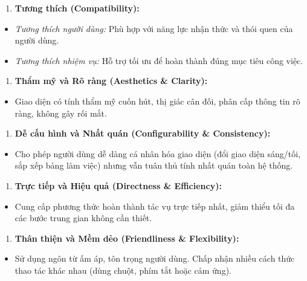 \documentclass[11pt,a4paper,oneside]{report}
\begin{document}
\begin{enumerate}[leftmargin=1.5em]
\item \textbf{Tương thích (Compatibility):}
\end{enumerate}
\begin{itemize}[leftmargin=1.5em]
\item \textit{Tương thích người dùng:} Phù hợp với năng lực nhận thức và thói quen của người dùng.
\item \textit{Tương thích nhiệm vụ:} Hỗ trợ tối ưu để hoàn thành đúng mục tiêu công việc.
\end{itemize}
\begin{enumerate}[leftmargin=1.5em]
\item \textbf{Thẩm mỹ và Rõ ràng (Aesthetics \& Clarity):}
\end{enumerate}
\begin{itemize}[leftmargin=1.5em]
\item Giao diện có tính thẩm mỹ cuốn hút, thị giác cân đối, phân cấp thông tin rõ ràng, không gây rối mắt.
\end{itemize}
\begin{enumerate}[leftmargin=1.5em]
\item \textbf{Dễ cấu hình và Nhất quán (Configurability \& Consistency):}
\end{enumerate}
\begin{itemize}[leftmargin=1.5em]
\item Cho phép người dùng dễ dàng cá nhân hóa giao diện (đổi giao diện sáng/tối, sắp xếp bảng làm việc) nhưng vẫn tuân thủ tính nhất quán toàn hệ thống.
\end{itemize}
\begin{enumerate}[leftmargin=1.5em]
\item \textbf{Trực tiếp và Hiệu quả (Directness \& Efficiency):}
\end{enumerate}
\begin{itemize}[leftmargin=1.5em]
\item Cung cấp phương thức hoàn thành tác vụ trực tiếp nhất, giảm thiểu tối đa các bước trung gian không cần thiết.
\end{itemize}
\begin{enumerate}[leftmargin=1.5em]
\item \textbf{Thân thiện và Mềm dẻo (Friendliness \& Flexibility):}
\end{enumerate}
\begin{itemize}[leftmargin=1.5em]
\item Sử dụng ngôn từ ấm áp, tôn trọng người dùng. Chấp nhận nhiều cách thức thao tác khác nhau (dùng chuột, phím tắt hoặc cảm ứng).
\end{itemize}
\end{document}
